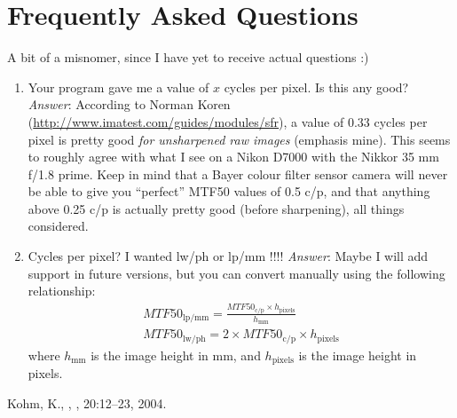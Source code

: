 \documentclass[a4paper]{article}
\begin{document}
\section{Frequently Asked Questions}
A bit of a misnomer, since I have yet to receive actual questions :)
\begin{enumerate}
  \item Your program gave me a value of $x$ cycles per pixel. Is this any
good? \emph{Answer}: According to Norman Koren
(\url{http://www.imatest.com/guides/modules/sfr}), a value of 0.33 cycles
per pixel is pretty good \emph{for unsharpened raw images} (emphasis mine).
This seems to roughly agree with what I see on a Nikon D7000 with the Nikkor
35 mm f/1.8 prime. Keep in mind that a Bayer colour filter sensor camera
will never be able to give you ``perfect'' MTF50 values of 0.5 c/p, and that
anything above 0.25 c/p is actually pretty good (before sharpening), 
all things considered.
  \item Cycles per pixel? I wanted lw/ph or lp/mm !!!! \emph{Answer}: Maybe I
will add support in future versions, but you can convert manually using the
following relationship:
    \begin{eqnarray}
	MTF50_{\mathrm{lp/mm}} = 
	  \frac{MTF50_{\mathrm{c/p}} \times h_{\mathrm{pixels}}}{h_{\mathrm{mm}}} \\
        MTF50_{\mathrm{lw/ph}} = 2 \times MTF50_{\mathrm{c/p}} \times h_{\mathrm{pixels}} 
    \end{eqnarray}
where $h_{\mathrm{mm}}$ is the image height in mm, and $h_{\mathrm{pixels}}$
is the image height in pixels.
\end{enumerate}

\begin{thebibliography}{9}
 Kohm, K., , , 20:12--23, 2004.
\end{thebibliography}
\end{document}
